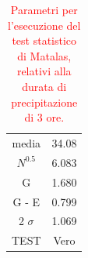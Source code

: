 \begin{table}[H] \centering
    \caption{\textcolor{red}{Parametri per l'esecuzione del test statistico di Matalas, relativi alla durata di precipitazione di 3 ore.}}
    \begin{tabular}{cc}
    \toprule
    media                  & 34.08 \\
    $N ^{0.5}$             &  6.083\\
    G                      & 1.680 \\
    G - E                  &  0.799\\
    2 $\sigma$             & 1.069 \\
    TEST                   & Vero \\
    \bottomrule
    \end{tabular}
\end{table}

